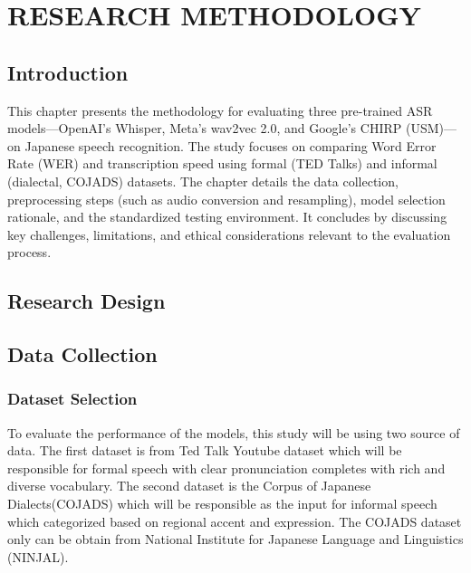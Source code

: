

\chapter{RESEARCH METHODOLOGY}

\section{Introduction}
This chapter presents the methodology for evaluating three pre-trained ASR models—OpenAI’s Whisper, Meta’s wav2vec 2.0, and Google’s CHIRP (USM)—on Japanese speech recognition. The study focuses on comparing Word Error Rate (WER) and transcription speed using formal (TED Talks) and informal (dialectal, COJADS) datasets. The chapter details the data collection, preprocessing steps (such as audio conversion and resampling), model selection rationale, and the standardized testing environment. It concludes by discussing key challenges, limitations, and ethical considerations relevant to the evaluation process.

\section{Research Design}


\section{Data Collection}
\subsection{Dataset Selection}
To evaluate the performance of the models, this study will be using two source of data. The first dataset is from Ted Talk Youtube dataset which will be responsible for formal speech with clear pronunciation completes with rich and diverse vocabulary. The second dataset is the Corpus of Japanese Dialects(COJADS) which will be responsible as the input for informal speech which categorized based on regional accent and expression. The COJADS dataset only can be obtain from National Institute for Japanese Language and Linguistics (NINJAL).


